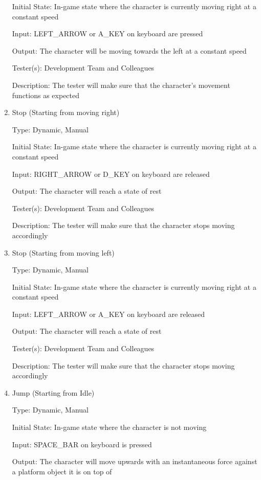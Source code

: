 \documentclass[12pt, titlepage]{article}
\begin{document}
\begin{enumerate}
Initial State: In-game state where the character is currently moving right at a constant speed

Input: LEFT\_ARROW or A\_KEY on keyboard are pressed

Output: The character will be moving towards the left at a constant speed

Tester(s): Development Team and Colleagues

Description: The tester will make sure that the character's movement functions as expected

\item{Stop (Starting from moving right)\\}

Type: Dynamic, Manual

Initial State: In-game state where the character is currently moving right at a constant speed

Input: RIGHT\_ARROW or D\_KEY on keyboard are released

Output: The character will reach a state of rest

Tester(s): Development Team and Colleagues

Description: The tester will make sure that the character stops moving accordingly

\item{Stop (Starting from moving left)\\}

Type: Dynamic, Manual

Initial State: In-game state where the character is currently moving right at a constant speed

Input: LEFT\_ARROW or A\_KEY on keyboard are released

Output: The character will reach a state of rest

Tester(s): Development Team and Colleagues

Description: The tester will make sure that the character stops moving accordingly

\item{Jump (Starting from Idle)\\}

Type: Dynamic, Manual

Initial State: In-game state where the character is not moving

Input: SPACE\_BAR on keyboard is pressed

Output: The character will move upwards with an instantaneous force against a platform object it is on top of


\end{enumerate}
\end{document}

